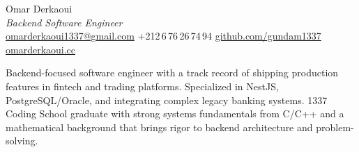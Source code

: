 \documentclass[10pt,a4paper,twoside,openany,nodeprecatedcode]{dndbook}
\begin{document}
\begin{center}
  {\fontsize{32}{38}\DndFontChapter\selectfont Omar Derkaoui}\\[6pt]
  {\large\itshape Backend Software Engineer}\\[10pt]
  {\small
    \faEnvelope\;\href{mailto:omarderkaoui1337@gmail.com}{omarderkaoui1337@gmail.com}
    \quad\textbar\quad
    \faPhone\;+212\,6\,76\,26\,74\,94
    \quad\textbar\quad
    \faGithub\;\href{https://github.com/gundam1337}{github.com/gundam1337}
    \quad\textbar\quad
    \faGlobe\;\href{https://omarderkaoui.cc}{omarderkaoui.cc}
  }
\end{center}

\vspace{4pt}

\begin{DndReadAloud}
  Backend-focused software engineer with a track record of shipping production features in
  fintech and trading platforms. Specialized in NestJS, PostgreSQL/Oracle, and integrating
  complex legacy banking systems. 1337 Coding School graduate with strong systems fundamentals
  from C/C++ and a mathematical background that brings rigor to backend architecture and
  problem-solving.
\end{DndReadAloud}

\vspace{6pt}
\end{document}

